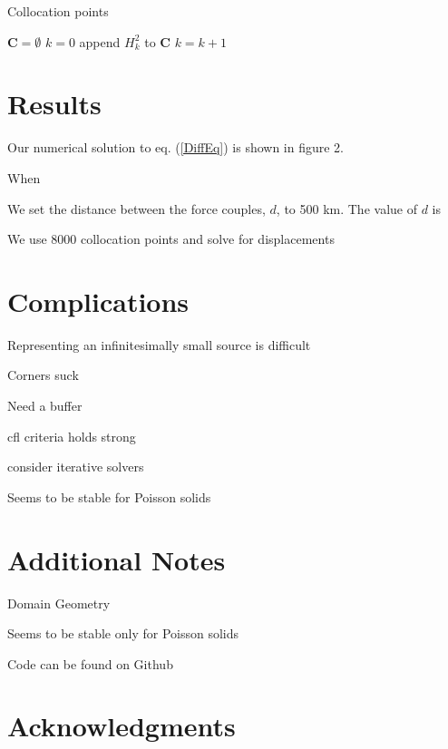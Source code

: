 \documentclass[12pt]{article}
\newcommand{\pythonscript}[2]{\begin{itemize}
                              \item[]
                              \end{itemize}}
\begin{document}
\begin{algorithm}[h!]
\caption{Collocation points}
\begin{algorithmic}
\STATE $\boldsymbol{C} = \emptyset$
\STATE $k = 0$
    \STATE append $H^2_k$ to $\boldsymbol{C}$
  \ENDIF
  \STATE $k = k + 1$  
\ENDWHILE
\end{algorithmic}
\end{algorithm}
\section*{Results}
Our numerical solution to eq. (\ref{DiffEq}) is shown in figure 2.  



When

We set the distance between the
force couples, $d$, to 500 km.    The value of $d$ is 

   
  

 We use 8000 collocation points and solve for displacements


\section*{Complications}
  Representing an infinitesimally small source is difficult

  Corners suck

  Need a buffer
  
  cfl criteria holds strong

  consider iterative solvers

  Seems to be stable for Poisson solids

  
\section*{Additional Notes}
  Domain Geometry
  
  

  Seems to be stable only for Poisson solids

  Code can be found on Github

\section*{Acknowledgments}

\end{document}
